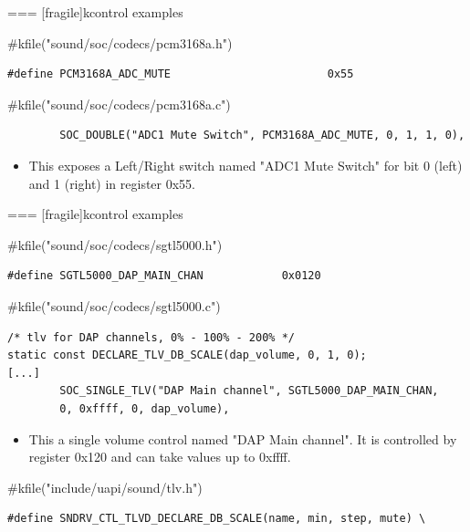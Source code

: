 === [fragile]{kcontrol examples}
  \begin{block}{#kfile("sound/soc/codecs/pcm3168a.h")}
    \fontsize{9}{9}\selectfont
    \begin{verbatim}
#define PCM3168A_ADC_MUTE                        0x55
    \end{verbatim}
  \end{block}
  \begin{block}{#kfile("sound/soc/codecs/pcm3168a.c")}
    \fontsize{9}{9}\selectfont
    \begin{verbatim}
        SOC_DOUBLE("ADC1 Mute Switch", PCM3168A_ADC_MUTE, 0, 1, 1, 0),
    \end{verbatim}
  \end{block}
  \begin{itemize}
  \item This exposes a Left/Right switch named "ADC1 Mute Switch" for
    bit 0 (left) and 1 (right) in register 0x55.
  \end{itemize}



=== [fragile]{kcontrol examples}
  \begin{block}{#kfile("sound/soc/codecs/sgtl5000.h")}
    \fontsize{9}{9}\selectfont
    \begin{verbatim}
#define SGTL5000_DAP_MAIN_CHAN            0x0120
    \end{verbatim}
  \end{block}
  \begin{block}{#kfile("sound/soc/codecs/sgtl5000.c")}
    \fontsize{9}{9}\selectfont
    \begin{verbatim}
/* tlv for DAP channels, 0% - 100% - 200% */
static const DECLARE_TLV_DB_SCALE(dap_volume, 0, 1, 0);
[...]
        SOC_SINGLE_TLV("DAP Main channel", SGTL5000_DAP_MAIN_CHAN,
        0, 0xffff, 0, dap_volume),
    \end{verbatim}
  \end{block}
  \begin{itemize}
  \item This a single volume control named "DAP Main channel".
    It is controlled by register 0x120 and can take values up to
    0xffff.
  \end{itemize}
  \begin{block}{#kfile("include/uapi/sound/tlv.h")}
    \fontsize{9}{9}\selectfont
    \begin{verbatim}
#define SNDRV_CTL_TLVD_DECLARE_DB_SCALE(name, min, step, mute) \
    \end{verbatim}
  \end{block}


